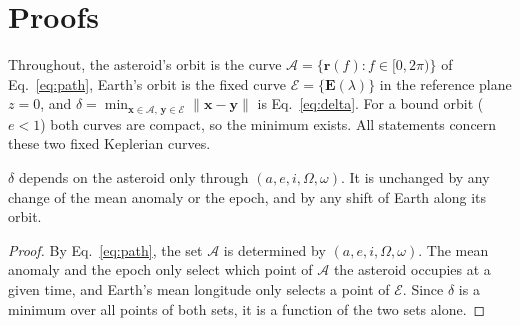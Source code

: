 \documentclass[make,article,submit,moreauthors]{Definitions/mdpi}
\begin{document}


\appendixstart
\appendix


\section{Proofs}
\label{app:proofs}
Throughout, the asteroid's orbit is the curve $\mathcal{A} = \{\mathbf{r}(f) : f \in [0, 2\pi)\}$ of Eq.~\eqref{eq:path}, Earth's orbit is the fixed curve $\mathcal{E} = \{\mathbf{E}(\lambda)\}$ in the reference plane $z = 0$, and $\delta = \min_{\mathbf{x}\in\mathcal{A},\,\mathbf{y}\in\mathcal{E}}\lVert\mathbf{x} - \mathbf{y}\rVert$ is Eq.~\eqref{eq:delta}. For a bound orbit ($e < 1$) both curves are compact, so the minimum exists. All statements concern these two fixed Keplerian curves.

\begin{Proposition}\label{prop:time}
$\delta$ depends on the asteroid only through $(a, e, i, \Omega, \omega)$. It is unchanged by any change of the mean anomaly or the epoch, and by any shift of Earth along its orbit.
\end{Proposition}
\begin{proof}
By Eq.~\eqref{eq:path}, the set $\mathcal{A}$ is determined by $(a, e, i, \Omega, \omega)$. The mean anomaly and the epoch only select which point of $\mathcal{A}$ the asteroid occupies at a given time, and Earth's mean longitude only selects a point of $\mathcal{E}$. Since $\delta$ is a minimum over all points of both sets, it is a function of the two sets alone.
\end{proof}
\end{document}
